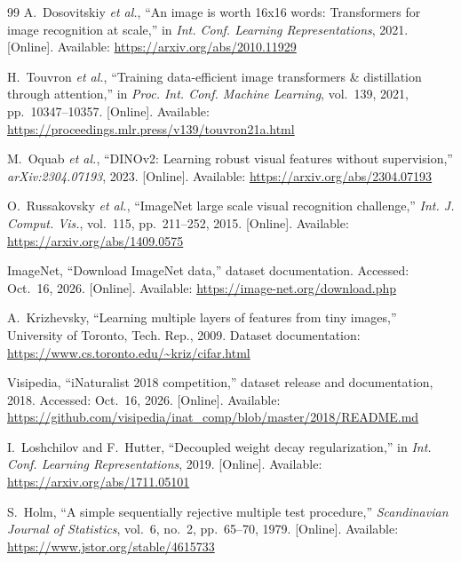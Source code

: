 \documentclass[conference]{IEEEtran}
\begin{document}
\begin{thebibliography}{99}
A.~Dosovitskiy \emph{et al.}, ``An image is worth 16x16 words: Transformers for image recognition at scale,'' in \emph{Int. Conf. Learning Representations}, 2021. [Online]. Available: \url{https://arxiv.org/abs/2010.11929}

H.~Touvron \emph{et al.}, ``Training data-efficient image transformers \& distillation through attention,'' in \emph{Proc. Int. Conf. Machine Learning}, vol.~139, 2021, pp.~10347--10357. [Online]. Available: \url{https://proceedings.mlr.press/v139/touvron21a.html}

M.~Oquab \emph{et al.}, ``DINOv2: Learning robust visual features without supervision,'' \emph{arXiv:2304.07193}, 2023. [Online]. Available: \url{https://arxiv.org/abs/2304.07193}

O.~Russakovsky \emph{et al.}, ``ImageNet large scale visual recognition challenge,'' \emph{Int. J. Comput. Vis.}, vol.~115, pp.~211--252, 2015. [Online]. Available: \url{https://arxiv.org/abs/1409.0575}

ImageNet, ``Download ImageNet data,'' dataset documentation. Accessed: Oct.~16, 2026. [Online]. Available: \url{https://image-net.org/download.php}

A.~Krizhevsky, ``Learning multiple layers of features from tiny images,'' University of Toronto, Tech. Rep., 2009. Dataset documentation: \url{https://www.cs.toronto.edu/~kriz/cifar.html}

Visipedia, ``iNaturalist 2018 competition,'' dataset release and documentation, 2018. Accessed: Oct.~16, 2026. [Online]. Available: \url{https://github.com/visipedia/inat_comp/blob/master/2018/README.md}

I.~Loshchilov and F.~Hutter, ``Decoupled weight decay regularization,'' in \emph{Int. Conf. Learning Representations}, 2019. [Online]. Available: \url{https://arxiv.org/abs/1711.05101}

S.~Holm, ``A simple sequentially rejective multiple test procedure,'' \emph{Scandinavian Journal of Statistics}, vol.~6, no.~2, pp.~65--70, 1979. [Online]. Available: \url{https://www.jstor.org/stable/4615733}

\end{thebibliography}
\end{document}
